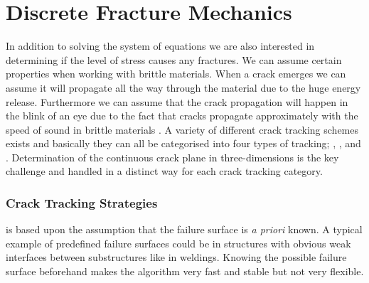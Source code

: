 






\section{Discrete Fracture Mechanics}
\label{sec:discrete-fracture-mechanics}
In addition to solving the system of equations we are also interested in
determining if the level of stress causes any fractures. We can
assume certain properties when working with brittle materials. When a
crack emerges we can assume it will propagate all the way through the
material due to the huge energy release. Furthermore we can assume
that the crack propagation will happen in the blink of an eye due to
the fact that cracks propagate approximately with the speed of sound in
brittle materials . A variety of different crack tracking schemes exists and
basically they can all be categorised into four types of tracking; , ,  and
. Determination of the continuous crack plane in
three-dimensions is the key challenge and handled in a distinct way
for each crack tracking category. \\

\subsubsection{Crack Tracking Strategies}
 is based upon the assumption that the failure
surface is \textit{a priori} known. A typical example of predefined
failure surfaces could be in structures with obvious weak interfaces
between substructures like in weldings. Knowing the possible failure
surface beforehand makes the algorithm very fast and stable but not
very flexible. \\

